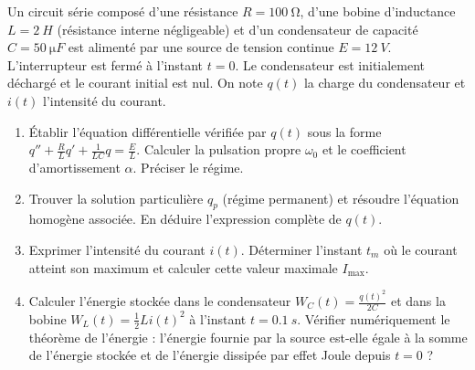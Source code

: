 \documentclass[11pt]{article}
\begin{document}
\begin{exercice}
Un circuit série composé d'une résistance $R = \SI{100}{\ohm}$, d'une bobine d'inductance $L = \SI{2}{H}$ (résistance interne négligeable) et d'un condensateur de capacité $C = \SI{50}{\micro F}$ est alimenté par une source de tension continue $E = \SI{12}{V}$. L'interrupteur est fermé à l'instant $t=0$. Le condensateur est initialement déchargé et le courant initial est nul. On note $q(t)$ la charge du condensateur et $i(t)$ l'intensité du courant.
\begin{enumerate}
    \item Établir l'équation différentielle vérifiée par $q(t)$ sous la forme $q'' + \frac{R}{L}q' + \frac{1}{LC}q = \frac{E}{L}$. Calculer la pulsation propre $\omega_0$ et le coefficient d'amortissement $\alpha$. Préciser le régime.
    \item Trouver la solution particulière $q_p$ (régime permanent) et résoudre l'équation homogène associée. En déduire l'expression complète de $q(t)$.
    \item Exprimer l'intensité du courant $i(t)$. Déterminer l'instant $t_m$ où le courant atteint son maximum et calculer cette valeur maximale $I_{\max}$.
    \item Calculer l'énergie stockée dans le condensateur $W_C(t) = \frac{q(t)^2}{2C}$ et dans la bobine $W_L(t) = \frac{1}{2}L i(t)^2$ à l'instant $t = \SI{0,1}{s}$. Vérifier numériquement le théorème de l'énergie : l'énergie fournie par la source est-elle égale à la somme de l'énergie stockée et de l'énergie dissipée par effet Joule depuis $t=0$ ?
\end{enumerate}
\end{exercice}
\end{document}
